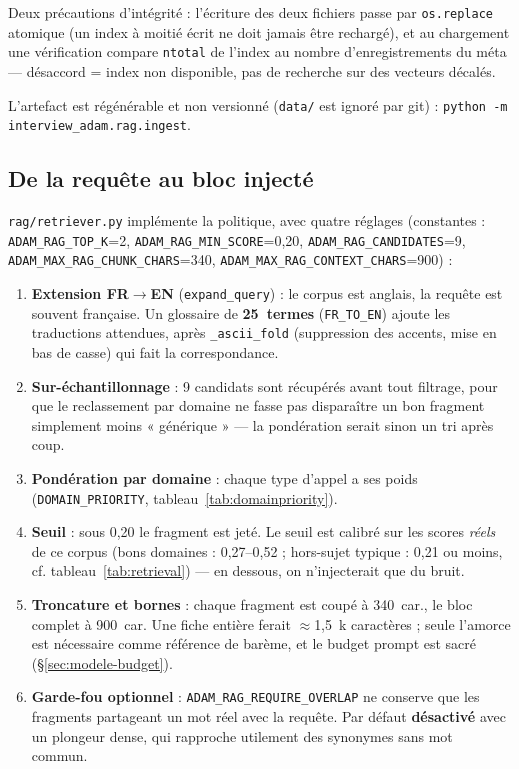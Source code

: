 Deux précautions d'intégrité : l'écriture des deux fichiers passe par
\texttt{os.replace} atomique (un index à moitié écrit ne doit jamais être
rechargé), et au chargement une vérification compare \texttt{ntotal} de l'index au
nombre d'enregistrements du méta --- désaccord = index non disponible, pas de
recherche sur des vecteurs décalés.

L'artefact est régénérable et non versionné (\texttt{data/} est ignoré par git) :
\texttt{python -m interview\_adam.rag.ingest}.

\subsection{De la requête au bloc injecté}
\label{sec:rag-service}

\texttt{rag/retriever.py} implémente la politique, avec quatre réglages
(constantes  : \texttt{ADAM\_RAG\_TOP\_K}=2,
\texttt{ADAM\_RAG\_MIN\_SCORE}=0,20, \texttt{ADAM\_RAG\_CANDIDATES}=9,
\texttt{ADAM\_MAX\_RAG\_CHUNK\_CHARS}=340,
\texttt{ADAM\_MAX\_RAG\_CONTEXT\_CHARS}=900) :

\begin{enumerate}[label=\arabic*.,leftmargin=*,itemsep=2pt]
  \item \textbf{Extension FR$\to$EN} (\texttt{expand\_query}) : le corpus est
        anglais, la requête est souvent française. Un glossaire de
        \textbf{25~termes} (\texttt{FR\_TO\_EN}) ajoute les traductions
        attendues, après \texttt{\_ascii\_fold} (suppression des accents, mise
        en bas de casse) qui fait la correspondance.
  \item \textbf{Sur-échantillonnage} : 9 candidats sont récupérés avant tout
        filtrage, pour que le reclassement par domaine ne fasse pas disparaître
        un bon fragment simplement moins « générique » --- la pondération serait
        sinon un tri après coup.
  \item \textbf{Pondération par domaine} : chaque type d'appel a ses poids
        (\texttt{DOMAIN\_PRIORITY}, tableau~\ref{tab:domainpriority}).
  \item \textbf{Seuil} : sous 0,20 le fragment est jeté. Le seuil est calibré
        sur les scores \emph{réels} de ce corpus (bons domaines : 0,27--0,52 ;
        hors-sujet typique : 0,21 ou moins, cf.
        tableau~\ref{tab:retrieval}) --- en dessous, on n'injecterait que du
        bruit.
  \item \textbf{Troncature et bornes} : chaque fragment est coupé à 340~car.,
        le bloc complet à 900~car. Une fiche entière ferait $\approx$1,5~k
        caractères ; seule l'amorce est nécessaire comme référence de barème,
        et le budget prompt est sacré (§\ref{sec:modele-budget}).
  \item \textbf{Garde-fou optionnel} : \texttt{ADAM\_RAG\_REQUIRE\_OVERLAP} ne
        conserve que les fragments partageant un mot réel avec la requête. Par
        défaut \textbf{désactivé} avec un plongeur dense, qui rapproche
        utilement des synonymes sans mot commun.
\end{enumerate}

